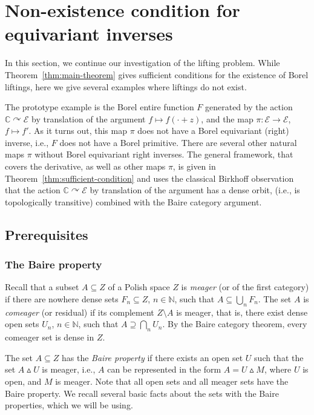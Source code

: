 \documentclass[12pt]{paper}
\numberwithin{equation}{section}
\theoremstyle{plain}
\theoremstyle{definition}
\newcommand{\C}{\mathbb{C}}
\newcommand{\N}{\mathbb{N}}
\newcommand{\acts}{\curvearrowright}
\newcommand{\symd}{\vartriangle}
\begin{document}
\section{Non-existence condition for equivariant inverses}
\label{sec:lack-equiv-invers}

In this section, we continue our investigation of the lifting problem.  While
Theorem~\ref{thm:main-theorem} gives sufficient conditions for the existence of Borel liftings, here
we give several examples where liftings do not exist.

The prototype example is the Borel entire function \(F\) generated by the action
\(\C \acts \mathcal E\) by translation of the argument \(f\mapsto f(\cdot +z)\), and the map
\(\pi\colon \mathcal E \to \mathcal E\), \(f\mapsto f'\).  As it turns out, this map \(\pi\) does
not have a Borel equivariant (right) inverse, i.e., \(F\) does not have a Borel primitive.  There
are several other natural maps \(\pi\) without Borel equivariant right inverses.  The general
framework, that covers the derivative, as well as other maps \(\pi\), is given in
Theorem~\ref{thm:sufficient-condition} and uses the classical Birkhoff observation that the action
\(\C \acts \mathcal E\) by translation of the argument has a dense orbit, (i.e., is topologically
transitive) combined with the Baire category argument.

\subsection{Prerequisites}
\label{subsect:Prerequisites}

\subsubsection{The Baire property}
Recall that a subset \(A \subseteq Z\) of a Polish space \(Z\) is \emph{meager} (or of the first
category) if there are nowhere dense sets \(F_n\subseteq Z\), \(n\in\N\), such that
\(A\subseteq \bigcup_n F_n\). The set \(A\) is \emph{comeager} (or residual) if its complement
\(Z\setminus A\) is meager, that is, there exist dense open sets \(U_n\), \(n\in \N\), such that
\(A\supseteq \bigcap_n U_n\).  By the Baire category theorem, every comeager set is dense in \(Z\).

The set \(A \subseteq Z\) has the \emph{Baire property} if there exists an open set \(U\) such that
the set \(A\symd U\) is meager, i.e., \(A\) can be represented in the form \(A=U\symd M\), where
\(U\) is open, and \(M\) is meager.  Note that all open sets and all meager sets have the Baire
property.  We recall several basic facts about the sets with the Baire properties, which we will be
using.
\end{document}
